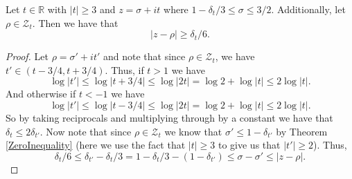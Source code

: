\begin{theorem}[GapSize]
\label{GapSize}
\leanok
Let $t\in\mathbb{R}$ with $|t|\geq 3$ and $z=\sigma+it$ where $1-\delta_t/3\leq\sigma\leq 3/2$.
   Additionally, let $\rho\in\mathcal{Z}_t$. Then we have that
   $$|z-\rho|\geq\delta_t/6.$$
\end{theorem}
\begin{proof}
\leanok
Let $\rho=\sigma'+it'$ and note that since $\rho\in\mathcal{Z}_t$, we have $t'\in(t-3/4,t+3/4)$.
    Thus, if $t>1$ we have
    $$\log|t'|\leq\log|t+3/4|\leq\log|2t|=\log 2+\log|t|\leq 2\log|t|.$$
    And otherwise if $t<-1$ we have
    $$\log|t'|\leq\log|t-3/4|\leq\log|2t|=\log 2+\log|t|\leq 2\log|t|.$$
    So by taking reciprocals and multiplying through by a constant we have
    that $\delta_t\leq2\delta_{t'}$. Now note that since $\rho\in\mathcal{Z}_t$
    we know that $\sigma'\leq 1-\delta_{t'}$ by Theorem \ref{ZeroInequality}
    (here we use the fact that $|t|\geq 3$ to give us that $|t'|\geq 2$). Thus,
    $$\delta_t/6\leq\delta_{t'}-\delta_t/3
      =1-\delta_t/3-(1-\delta_{t'})\leq\sigma-\sigma'\leq|z-\rho|.$$
\end{proof}
